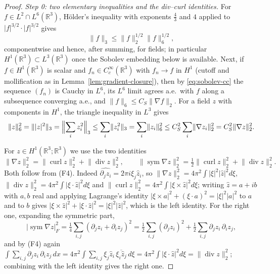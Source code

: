 \documentclass[11pt]{article}
\theoremstyle{definition}
\theoremstyle{plain}
\newcommand{\R}{\mathbb R}
\newcommand{\norm}[1]{\lVert #1\rVert}
\begin{document}
\begin{proof}
\emph{Step 0: two elementary inequalities and the div--curl identities.}
For $f\in L^2\cap L^6(\R^3)$, H\"older's inequality with exponents
$\frac43$ and $4$ applied to $|f|^{3/2}\cdot|f|^{3/2}$ gives
\begin{equation}\label{eq:qdc-interp}
 \norm f_3\le\norm f_2^{1/2}\norm f_6^{1/2},
\end{equation}
componentwise and hence, after summing, for fields; in particular
$H^1(\R^3)\subset L^3(\R^3)$ once the Sobolev embedding below is available.
Next, if $f\in H^1(\R^3)$ is scalar and $f_n\in C_c^\infty(\R^3)$ with
$f_n\to f$ in $H^1$ (cutoff and mollification as in
Lemma~\ref{lem:gradient-closure}), then by \eqref{eq:sobolev-cc} the
sequence $(f_n)$ is Cauchy in $L^6$, its $L^6$ limit agrees a.e.\ with $f$
along a subsequence converging a.e., and $\norm f_6\le C_S\norm{\nabla f}_2$.
For a field $z$ with components in $H^1$, the triangle inequality in $L^3$
gives
\begin{equation}\label{eq:qdc-sobolev-field}
 \norm z_6^2=\norm{|z|^2}_3=\Bigl\|\sum_iz_i^2\Bigr\|_3
 \le\sum_i\norm{z_i^2}_3=\sum_i\norm{z_i}_6^2
 \le C_S^2\sum_i\norm{\nabla z_i}_2^2=C_S^2\norm{\nabla z}_2^2 .
\end{equation}

For $z\in H^1(\R^3;\R^3)$ we use the two identities
\begin{equation}\label{eq:qdc-hodge}
 \norm{\nabla z}_2^2=\norm{\operatorname{curl}z}_2^2+\norm{\operatorname{div}z}_2^2,
 \qquad
 \norm{\operatorname{sym}\nabla z}_2^2
 =\tfrac12\norm{\operatorname{curl}z}_2^2+\norm{\operatorname{div}z}_2^2 .
\end{equation}
Both follow from (F4).  Indeed $\widehat{\partial_jz_i}=2\pi i\xi_j\hat z_i$,
so $\norm{\nabla z}_2^2=4\pi^2\int|\xi|^2|\hat z|^2d\xi$,
$\norm{\operatorname{div}z}_2^2=4\pi^2\int|\xi\cdot\hat z|^2d\xi$ and
$\norm{\operatorname{curl}z}_2^2=4\pi^2\int|\xi\times\hat z|^2d\xi$;
writing $\hat z=a+ib$ with $a,b$ real and applying Lagrange's identity
$|\xi\times a|^2+(\xi\cdot a)^2=|\xi|^2|a|^2$ to $a$ and to $b$ gives
$|\xi\times\hat z|^2+|\xi\cdot\hat z|^2=|\xi|^2|\hat z|^2$, which is the
left identity.  For the right one, expanding the symmetric part,
\[
 |\operatorname{sym}\nabla z|_F^2
 =\tfrac14\sum_{i,j}(\partial_jz_i+\partial_iz_j)^2
 =\tfrac12\sum_{i,j}(\partial_jz_i)^2
 +\tfrac12\sum_{i,j}\partial_jz_i\,\partial_iz_j ,
\]
and by (F4) again
$\int\sum_{i,j}\partial_jz_i\,\partial_iz_j\,dx
=4\pi^2\int\sum_{i,j}\xi_j\hat z_i\,\overline{\xi_i\hat z_j}\,d\xi
=4\pi^2\int|\xi\cdot\hat z|^2d\xi=\norm{\operatorname{div}z}_2^2$;
combining with the left identity gives the right one.


\end{proof}
\end{document}
